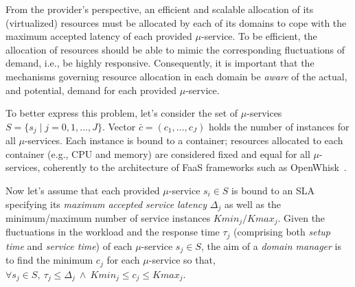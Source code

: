 From the provider's perspective, an efficient and scalable allocation of its (virtualized) resources 
must be allocated by each of its domains to cope with the maximum accepted latency of each provided $\mu$-service. To be efficient, the allocation of resources should be able to mimic the corresponding fluctuations of demand, i.e., be highly responsive. Consequently, it is important that the mechanisms governing resource allocation in each domain be \textit{aware} of the actual, and potential, demand for each provided $\mu$-service.

To better express this problem, let's consider the set of $\mu$-services $S = \{s_j \mid j = 0,1,...,J\}$.
Vector $\bar{c} = (c_1, ..., c_J)$ holds the number of instances for all $\mu$-services. Each instance is bound to a container; resources allocated to each container 
(e.g., CPU and memory) are considered fixed and equal for all $\mu$-services, coherently to the architecture of FaaS frameworks such as OpenWhisk~\cite{OpenWhisk}.

Now let's assume that each provided $\mu$-service $s_i \in S$ is bound to an SLA specifying its \textit{maximum accepted service latency} $\Delta_j$ 
as well as the minimum/maximum number of service instances $Kmin_{j}/Kmax_{j}$. %
Given the fluctuations in the workload and the response time $\tau_j$ (comprising both \textit{setup time} and \textit{service time}) of each $\mu$-service $s_j \in S$, the aim of a \textit{domain manager} is to find the minimum $c_j$ for each $\mu$-service so that, $\forall s_j \in S,\ \tau_j \le \Delta_j\ \wedge\ Kmin_j \le c_j \le Kmax_j$. 





